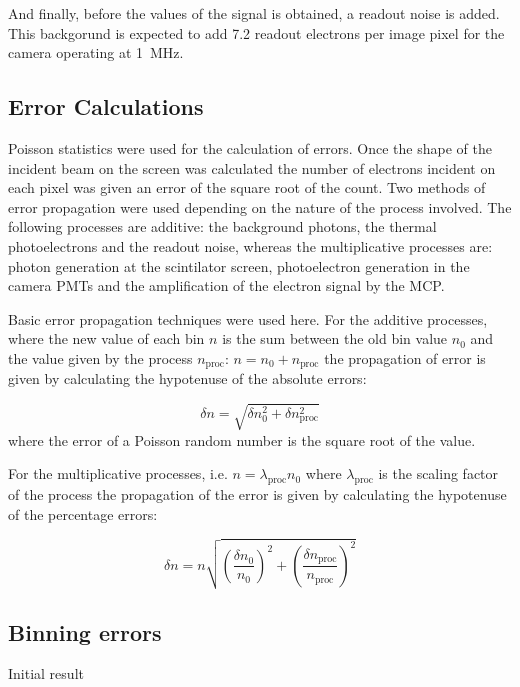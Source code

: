 And finally, before the values of the signal is obtained, a readout noise is
added. This backgorund is expected to add \num{7.2} readout electrons per image
pixel for the camera operating at \SI{1}{\mega\hertz}.

\subsection{Error Calculations}

Poisson statistics were used for the calculation of errors.  Once the shape of
the incident beam on the screen was calculated the number of electrons incident
on each pixel was given an error of the square root of the count. Two methods
of error propagation were used depending on the nature of the process involved.
The following processes are additive: the background photons, the thermal
photoelectrons and the readout noise, whereas the multiplicative processes are:
photon generation at the scintilator screen, photoelectron generation in the
camera PMTs and the amplification of the electron signal by the MCP.

Basic error propagation techniques were used here. For the additive processes,
where the new value of each bin $n$ is the sum between the old bin value $n_0$
and the value given by the process $n_\text{proc}$: $n=n_0+n_\text{proc}$ the
propagation of error is given by calculating the hypotenuse of the absolute
errors:

\begin{equation}
	\delta n= \sqrt{\delta n_0^2 + \delta n_\text{proc}^2}
\end{equation}
%
where the error of a Poisson random number is the square root of the value.

For the multiplicative processes, i.e. $n = \lambda_\text{proc}n_0 $ where
$\lambda_\text{proc}$ is the scaling factor of the process the propagation of
the error is given by calculating the hypotenuse of the percentage errors:

\begin{equation}
	\delta n= n \sqrt{
		\left( \frac{\delta n_0}{n_0} \right)^2 +
		\left( \frac{\delta n_\text{proc}}{n_\text{proc}} \right)^2}
\end{equation}



\subsection{Binning errors}

Initial result

